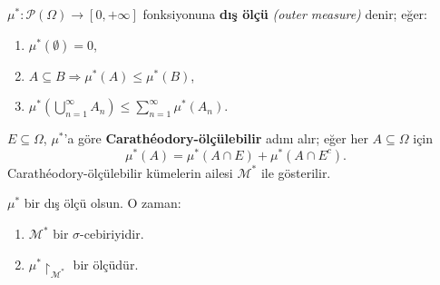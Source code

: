 \begin{tanim}\label{def:dismolcu}
$\mu^*: \mathcal{P}(\Omega) \to [0,+\infty]$ fonksiyonuna \textbf{dış ölçü}
\emph{(outer measure)} denir; eğer:
\begin{enumerate}[label=(\alph*)]
  \item $\mu^*(\emptyset) = 0$,
  \item $A \subseteq B \Rightarrow \mu^*(A) \leq \mu^*(B)$,
  \item $\mu^*\!\left(\bigcup_{n=1}^\infty A_n\right) \leq \sum_{n=1}^\infty \mu^*(A_n)$.
\end{enumerate}
\end{tanim}

\begin{tanim}\label{def:caratheodory}
$E \subseteq \Omega$, $\mu^*$'a göre \textbf{Carathéodory-ölçülebilir} adını alır;
eğer her $A \subseteq \Omega$ için
\[
  \mu^*(A) = \mu^*(A \cap E) + \mu^*(A \cap E^c).
\]
Carathéodory-ölçülebilir kümelerin ailesi $\mathcal{M}^*$ ile gösterilir.
\end{tanim}

\begin{teorem}\label{thm:caratheodory}
$\mu^*$ bir dış ölçü olsun. O zaman:
\begin{enumerate}[label=(\roman*)]
  \item $\mathcal{M}^*$ bir $\sigma$-cebiriyidir.
  \item $\mu^*\!\restriction_{\mathcal{M}^*}$ bir ölçüdür.
\end{enumerate}
\end{teorem}

